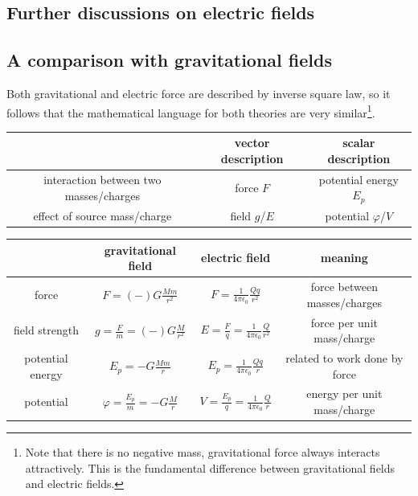 \documentclass[a4paper,12pt]{book}
\begin{document}
\subsection{Further discussions on electric fields}

\subsection{A comparison with gravitational fields}

Both gravitational and electric force are described by inverse square law, so it follows that the mathematical language for both theories are very similar\footnote{Note that there is no negative mass, gravitational force always interacts attractively. This is the fundamental difference between gravitational fields and electric fields.}.

\begin{center}
	\begin{tabular}{|c|c|c|}
		\hline
		& vector description & scalar description \\ \hline 
		interaction between two masses/charges & force $F$ & potential energy $E_p$ \\ \hline
		effect of source mass/charge & field $g$/$E$ & potential $\varphi$/$V$ \\ \hline
	\end{tabular}
\end{center}

\begin{center}
{\renewcommand{\arraystretch}{1.28}
\begin{tabular}{|c|c|c|c|}
\hline
& gravitational field & electric field & meaning \\ \hline 
force & $F=(-)G \frac{Mm}{r^2}$ & $F=\frac{1}{4\pi\epsilon_0} \frac{Qq}{r^2}$ & force between masses/charges\\ [1ex] \hline
field strength & $g= \frac{F}{m} = (-)G \frac{M}{r^2}$ & $E= \frac{F}{q} = \frac{1}{4\pi\epsilon_0} \frac{Q}{r^2}$ & force per unit mass/charge\\ [1ex] \hline
potential energy &  $E_p = -G \frac{Mm}{r}$ & $E_p=\frac{1}{4\pi\epsilon_0} \frac{Qq}{r}$ & related to work done by force \\ [1ex] \hline
potential & $\varphi = \frac{E_p}{m} = -G \frac{M}{r}$ & $V = \frac{E_p}{q} = \frac{1}{4\pi\epsilon_0} \frac{Q}{r}$ & energy per unit mass/charge\\ [1ex] \hline
\end{tabular}}
\end{center}
\end{document}
